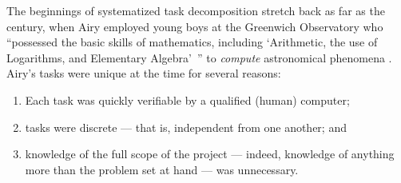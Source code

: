 \documentclass[trackingWork]{subfiles}
\begin{document}
\subsubsubsection{\pieceworkpers}
The beginnings of systematized task decomposition stretch back as far as the  century,
when Airy employed young boys at the Greenwich Observatory who
``possessed the basic skills of mathematics, including
`Arithmetic, the use of Logarithms, and Elementary Algebra'~''
to \textit{compute} astronomical phenomena
\cite{grier2013computers}.
Airy's tasks were unique at the time for several reasons:
\begin{enumerate}
  \item Each task was quickly verifiable by a qualified (human) computer;
  \item tasks were discrete --- that is, independent from one another; and
  \item knowledge of the full scope of the project
  --- indeed, knowledge of anything more than the problem set at hand ---
  was unnecessary.
\end{enumerate}


\subsubsubsection{\whatchanged}
\end{document}
